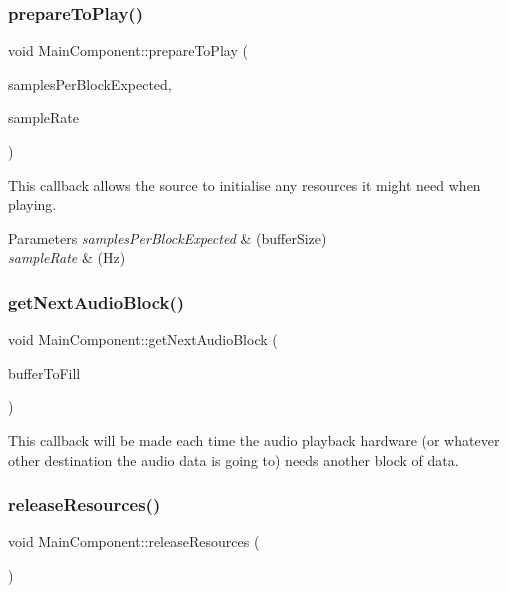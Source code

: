 \subsubsection{\texorpdfstring{prepareToPlay()}{prepareToPlay()}}
{\footnotesize\ttfamily void Main\+Component\+::prepare\+To\+Play (\begin{DoxyParamCaption}\item[{int}]{samples\+Per\+Block\+Expected,  }\item[{double}]{sample\+Rate }\end{DoxyParamCaption})\hspace{0.3cm}{\ttfamily [override]}}

This callback allows the source to initialise any resources it might need when playing. 
\begin{DoxyParams}{Parameters}
{\em samples\+Per\+Block\+Expected} & (buffer\+Size) \\
\hline
{\em sample\+Rate} & (Hz) \\
\hline
\end{DoxyParams}
\mbox{\label{class_main_component_a3c29a96205065fbe01eb6e0576f0ffa3}} 
\subsubsection{\texorpdfstring{getNextAudioBlock()}{getNextAudioBlock()}}
{\footnotesize\ttfamily void Main\+Component\+::get\+Next\+Audio\+Block (\begin{DoxyParamCaption}\item[{const Audio\+Source\+Channel\+Info \&}]{buffer\+To\+Fill }\end{DoxyParamCaption})\hspace{0.3cm}{\ttfamily [override]}}

This callback will be made each time the audio playback hardware (or whatever other destination the audio data is going to) needs another block of data. \mbox{\label{class_main_component_a38548494a56d6085df37edb026d3184d}} 
\subsubsection{\texorpdfstring{releaseResources()}{releaseResources()}}
{\footnotesize\ttfamily void Main\+Component\+::release\+Resources (\begin{DoxyParamCaption}{ }\end{DoxyParamCaption})\hspace{0.3cm}{\ttfamily [override]}}

